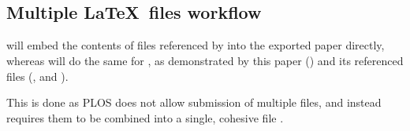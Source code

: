 \subsection*{Multiple \LaTeX~files workflow}

 will embed the contents of files referenced by \verb|| into the exported paper directly, whereas  will do the same for \verb||, as demonstrated by this paper () and its referenced  files (,   and ).

This is done as PLOS does not allow submission of multiple  files, and instead requires them to be combined into a single, cohesive  file \cite{PLOS:LaTeX}.
